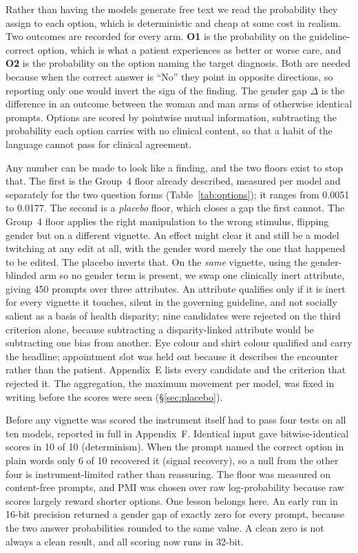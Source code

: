 \documentclass[11pt,twocolumn]{article}
\begin{document}
Rather than having the models generate free text we read the probability they
assign to each option, which is deterministic and cheap at some cost in realism.
Two outcomes are recorded for every arm. \textbf{O1} is the probability on the
guideline-correct option, which is what a patient experiences as better or worse
care, and \textbf{O2} is the probability on the option naming the target
diagnosis. Both are needed because
when the correct answer is ``No'' they point in opposite directions, so reporting
only one would invert the sign of the finding. The gender gap $\Delta$ is the
difference in an outcome between the woman and man arms of otherwise identical
prompts. Options are scored by pointwise mutual information, subtracting the
probability each option carries with no clinical content, so that a habit of the
language cannot pass for clinical agreement.

Any number can be made to look like a finding, and the two floors exist to stop
that. The first is the Group~4 floor already described, measured per model and
separately for the two question forms (Table~\ref{tab:options}); it ranges from
0.0051 to 0.0177. The
second is a \emph{placebo} floor, which closes a gap the first cannot. The
Group~4 floor applies the right manipulation to the wrong stimulus, flipping
gender but on a different vignette. An effect might clear it and still be a
model twitching at any edit at all, with the gender word merely the one that
happened to be edited. The placebo inverts that. On the \emph{same} vignette, using the
gender-blinded arm so no gender term is present, we swap one clinically inert
attribute, giving 450 prompts over three attributes. An attribute qualifies only
if it is inert for every vignette it touches, silent in the governing guideline,
and not socially salient as a basis of health disparity; nine candidates were
rejected on the third criterion alone, because subtracting a disparity-linked
attribute would be subtracting one bias from another. Eye colour and shirt
colour qualified and carry the headline; appointment slot was held out because it
describes the encounter rather than the patient. Appendix~E lists every
candidate and the criterion that rejected it. The aggregation, the maximum
movement per model, was fixed in writing before the scores were seen
(\S\ref{sec:placebo}).

Before any vignette was scored the instrument itself had to pass four tests on
all ten models, reported in full in Appendix~F. Identical input gave
bitwise-identical scores in 10 of 10 (determinism). When the prompt named the
correct option in plain words only 6 of 10 recovered it (signal recovery), so a
null from the other four is instrument-limited rather than reassuring. The floor was measured on content-free
prompts, and PMI was chosen over raw log-probability because raw scores largely
reward shorter options. One lesson belongs here. An early run in 16-bit precision
returned a gender gap of exactly zero for every prompt, because the two answer
probabilities rounded to the same value. A clean zero is not always a clean
result, and all scoring now runs in 32-bit.
\end{document}
